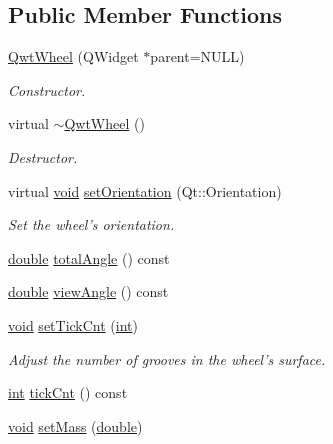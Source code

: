 \subsection*{Public Member Functions}
\begin{DoxyCompactItemize}
\item 
\hyperlink{class_qwt_wheel_a98fc47123aac47168b5d98a73b87d0a7}{Qwt\-Wheel} (Q\-Widget $\ast$parent=N\-U\-L\-L)
\begin{DoxyCompactList}\small\item\em Constructor. \end{DoxyCompactList}\item 
virtual \hyperlink{class_qwt_wheel_a57f465a31a9d2d88cb7a1d0e6391535e}{$\sim$\-Qwt\-Wheel} ()
\begin{DoxyCompactList}\small\item\em Destructor. \end{DoxyCompactList}\item 
virtual \hyperlink{group___u_a_v_objects_plugin_ga444cf2ff3f0ecbe028adce838d373f5c}{void} \hyperlink{class_qwt_wheel_acae74c8161fd1df728f26253dd1defa8}{set\-Orientation} (Qt\-::\-Orientation)
\begin{DoxyCompactList}\small\item\em Set the wheel's orientation. \end{DoxyCompactList}\item 
\hyperlink{_super_l_u_support_8h_a8956b2b9f49bf918deed98379d159ca7}{double} \hyperlink{class_qwt_wheel_ac05734986ee427e6d820f54a267dde26}{total\-Angle} () const 
\item 
\hyperlink{_super_l_u_support_8h_a8956b2b9f49bf918deed98379d159ca7}{double} \hyperlink{class_qwt_wheel_a49c04ea6e1ec21268f63d45239bc9333}{view\-Angle} () const 
\item 
\hyperlink{group___u_a_v_objects_plugin_ga444cf2ff3f0ecbe028adce838d373f5c}{void} \hyperlink{class_qwt_wheel_accd38f95f11e33ab2939a39293134c3a}{set\-Tick\-Cnt} (\hyperlink{ioapi_8h_a787fa3cf048117ba7123753c1e74fcd6}{int})
\begin{DoxyCompactList}\small\item\em Adjust the number of grooves in the wheel's surface. \end{DoxyCompactList}\item 
\hyperlink{ioapi_8h_a787fa3cf048117ba7123753c1e74fcd6}{int} \hyperlink{class_qwt_wheel_a02e84c468d3175278a490185ca4a7c2a}{tick\-Cnt} () const 
\item 
\hyperlink{group___u_a_v_objects_plugin_ga444cf2ff3f0ecbe028adce838d373f5c}{void} \hyperlink{class_qwt_wheel_a2af8b9b10ebff58b351027208c1e2b86}{set\-Mass} (\hyperlink{_super_l_u_support_8h_a8956b2b9f49bf918deed98379d159ca7}{double})

\end{DoxyCompactItemize}
